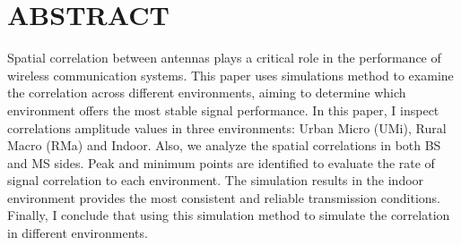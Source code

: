 \section*{ABSTRACT}
Spatial correlation between antennas plays a critical role in the performance of wireless communication systems. This paper uses simulations method to examine the correlation across different environments, aiming to determine which environment offers the most stable signal performance. In this paper, I inspect correlations amplitude values in three environments: Urban Micro (UMi), Rural Macro (RMa) and Indoor. Also, we analyze the spatial correlations in both BS and MS sides. Peak and minimum points are identified to evaluate the rate of signal correlation to each environment. The simulation results in the indoor environment provides the most consistent and reliable transmission conditions. Finally, I conclude that using this simulation method to simulate the correlation in different environments.
\cleardoublepage